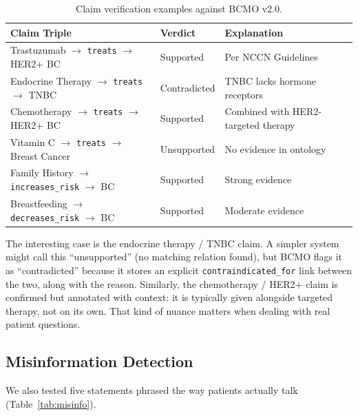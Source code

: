 \documentclass[10pt,a4paper]{article}
\begin{document}
\begin{table}[H]
    \centering
    \caption{Claim verification examples against BCMO v2.0.}
    \label{tab:verification}
    \vspace{2pt}
    \begin{tabular}{@{}p{5.2cm}lp{4cm}@{}}
        \toprule
        \textbf{Claim Triple} & \textbf{Verdict} & \textbf{Explanation} \\
        \midrule
        Trastuzumab $\rightarrow$ \texttt{treats} $\rightarrow$ HER2+ BC
            & Supported    & Per NCCN Guidelines \\[3pt]
        Endocrine Therapy $\rightarrow$ \texttt{treats} $\rightarrow$ TNBC
            & Contradicted & TNBC lacks hormone receptors \\[3pt]
        Chemotherapy $\rightarrow$ \texttt{treats} $\rightarrow$ HER2+ BC
            & Supported    & Combined with HER2-targeted therapy \\[3pt]
        Vitamin C $\rightarrow$ \texttt{treats} $\rightarrow$ Breast Cancer
            & Unsupported  & No evidence in ontology \\[3pt]
        Family History $\rightarrow$ \texttt{increases\_risk} $\rightarrow$ BC
            & Supported    & Strong evidence \\[3pt]
        Breastfeeding $\rightarrow$ \texttt{decreases\_risk} $\rightarrow$ BC
            & Supported    & Moderate evidence \\
        \bottomrule
    \end{tabular}
\end{table}

The interesting case is the endocrine therapy / TNBC claim. A simpler system might call this ``unsupported'' (no matching relation found), but BCMO flags it as ``contradicted'' because it stores an explicit \texttt{contraindicated\_for} link between the two, along with the reason. Similarly, the chemotherapy / HER2+ claim is confirmed but annotated with context: it is typically given alongside targeted therapy, not on its own. That kind of nuance matters when dealing with real patient questions.

\subsection{Misinformation Detection}

We also tested five statements phrased the way patients actually talk (Table~\ref{tab:misinfo}).
\end{document}
